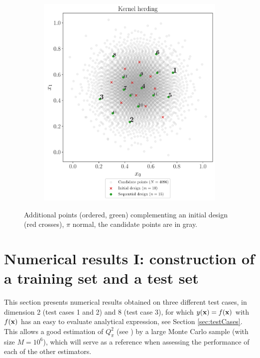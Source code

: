 \begin{figure}
\begin{subfigure}[b]{0.48\linewidth}
  \end{subfigure}
  \\
  \begin{subfigure}[b]{0.48\linewidth}
    \centering
    \includegraphics[width=\textwidth]{./part2/figures/SIS/normal2D_KH.pdf}
  \end{subfigure}
  \caption{Additional points (ordered, green) complementing an initial design (red crosses), $\pi$ normal, the candidate points are in gray.}
  \label{fig:normal_validation_designs}
\end{figure}   





\section{Numerical results I: construction of a training set and a test set}\label{sec:val_res1}
This section presents numerical results obtained on three different test cases, in dimension 2 (test cases 1 and 2) and 8 (test case 3), for which $y({\bf x})=f({\bf x})$ with $f({\bf x})$ has an easy to evaluate analytical expression, see Section \ref{sec:testCases}. 
This allows a good estimation of $Q_\pi^2$ (see ) by a large Monte Carlo sample (with size $M=10^6$), which will serve as a reference when assessing the performance of each of the other estimators. 


